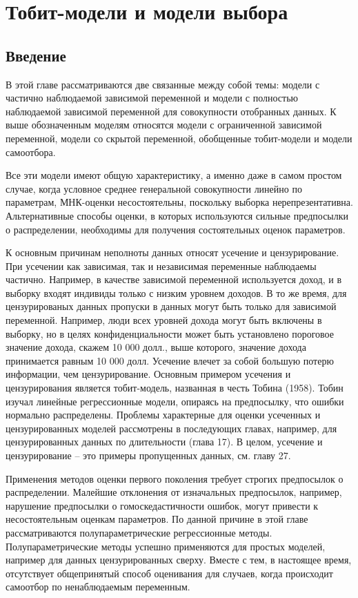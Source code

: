 
\chapter {Тобит-модели и модели выбора}

\section{Введение}

В этой главе рассматриваются две связанные между собой темы: модели с частично наблюдаемой зависимой переменной и модели с полностью наблюдаемой зависимой переменной для совокупности отобранных данных. К выше обозначенным моделям относятся модели с ограниченной зависимой переменной, модели со скрытой переменной, обобщенные тобит-модели и модели самоотбора. 

Все эти модели имеют общую характеристику, а именно даже в самом простом случае, когда условное среднее генеральной совокупности линейно по параметрам, МНК-оценки несостоятельны, поскольку выборка нерепрезентативна. Альтернативные способы оценки, в которых используются сильные предпосылки о распределении, необходимы для получения состоятельных оценок параметров.

К основным причинам неполноты данных относят усечение и цензурирование. При усечении как зависимая, так и независимая переменные наблюдаемы частично. Например, в качестве зависимой переменной используется доход, и в выборку входят индивиды только с низким уровнем доходов. В то же время, для цензурированых данных пропуски в данных могут быть только для зависимой переменной. Например, люди всех уровней дохода могут быть включены в выборку, но в целях конфиденциальности может быть установлено пороговое значение дохода, скажем 10 000 долл., выше которого, значение дохода принимается равным 10 000 долл. Усечение влечет за собой большую потерю информации, чем цензурирование. Основным примером усечения и цензурирования является тобит-модель, названная в честь Тобина (1958). Тобин изучал линейные регрессионные модели, опираясь на предпосылку, что ошибки нормально распределены. Проблемы характерные для оценки усеченных и цензурированных моделей рассмотрены в последующих главах, например, для цензурированных данных по длительности (глава 17). В целом, усечение и цензурирование -- это примеры пропущенных данных, см. главу 27.

Применения методов оценки первого поколения требует строгих предпосылок о распределении. Малейшие отклонения от изначальных предпосылок, например, нарушение предпосылки о гомоскедастичности ошибок, могут привести к несостоятельным оценкам параметров. По данной причине в этой главе рассматриваются полупараметрические регрессионные методы. Полупараметрические методы успешно применяются для простых моделей, например для данных цензурированных сверху. Вместе с тем, в настоящее время, отсутствует общепринятый способ оценивания для случаев, когда происходит самоотбор по ненаблюдаемым переменным.

